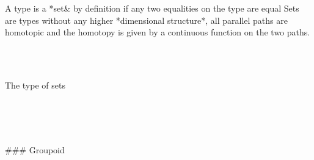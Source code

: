 A type is a *set& by definition if any two equalities on the type are equal Sets
are types without any higher *dimensional structure*,  all parallel paths are
homotopic and the homotopy is given by a continuous function on the two paths.

\begin{code}%
\>[0]\<%
\\
\>[0][@{}l@{\AgdaIndent{0}}]%
\>[2]\AgdaSymbol{:}\AgdaSpace{}%
\AgdaSpace{}%
\AgdaSpace{}%
\AgdaSpace{}%
\AgdaSpace{}%
\<%
\\
\>[0]\AgdaSpace{}%
\AgdaSpace{}%
\AgdaSymbol{=}\AgdaSpace{}%
\AgdaSymbol{(}\AgdaSpace{}%
\AgdaSpace{}%
\AgdaSymbol{:}\AgdaSpace{}%
\AgdaSymbol{)}\AgdaSpace{}%
\AgdaSpace{}%
\AgdaSpace{}%
\AgdaSymbol{(}\AgdaSpace{}%
\AgdaOperator{\AgdaDatatype{==}}\AgdaSpace{}%
\AgdaSymbol{)}\<%
\end{code}

The type of sets

\begin{code}%
\>[0]\<%
\\
\>[0][@{}l@{\AgdaIndent{0}}]%
\>[2]\AgdaSymbol{:}\AgdaSpace{}%
\AgdaSpace{}%
\AgdaSymbol{(}\AgdaSpace{}%
\AgdaSymbol{)}\<%
\\
%
\\[\AgdaEmptyExtraSkip]%
\>[0]\AgdaSpace{}%
\AgdaSymbol{\{}\AgdaSymbol{\}}\AgdaSpace{}%
\AgdaSymbol{=}\AgdaSpace{}%
\AgdaSpace{}%
\AgdaSymbol{(}\AgdaSpace{}%
\AgdaSymbol{)}\AgdaSpace{}%
\<%
\end{code}

### Groupoid

\begin{code}%
\>[0]\<%
\\
\>[0][@{}l@{\AgdaIndent{0}}]%
\>[2]\AgdaSymbol{:}\AgdaSpace{}%
\AgdaSpace{}%
\AgdaSpace{}%
\AgdaSpace{}%
\AgdaSpace{}%
\<%
\\
%
\\[\AgdaEmptyExtraSkip]%
\>[0]\AgdaSpace{}%
%
\>[14]\AgdaSymbol{=}\AgdaSpace{}%
\AgdaSymbol{(}\AgdaSpace{}%
\AgdaSpace{}%
\AgdaSymbol{:}\AgdaSpace{}%
\AgdaSymbol{)}\AgdaSpace{}%
\AgdaSpace{}%
\AgdaSpace{}%
\AgdaSymbol{(}\AgdaSpace{}%
\AgdaSpace{}%
\AgdaSymbol{)}\<%
\end{code}

